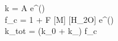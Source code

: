 k = A e^{()} \\
f_c = 1 + F [\mbox{M}] [\mbox{H}_2\mbox{O}]  e^{()}\\
k_{\mbox{tot}} =  (k_0 +  k_\infty) f_c
